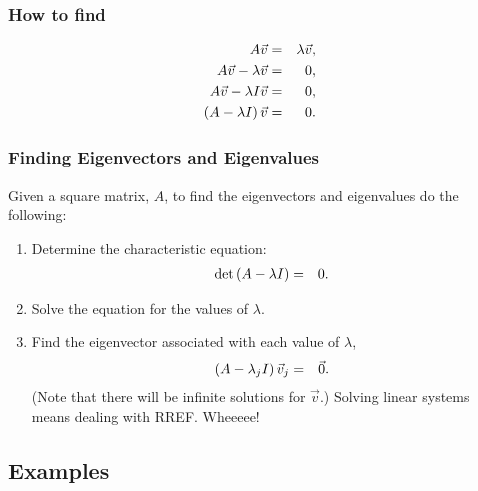 \begin{frame}
  \frametitle{How to find}

  \begin{eqnarray*}
    A \vec{v} & = & \lambda \vec{v}, \\
    A \vec{v} - \lambda \vec{v} & = & 0, \\
    A \vec{v} - \lambda I \vec{v} & = & 0, \\
    \left( A - \lambda I \right) \vec{v} & = & 0.
  \end{eqnarray*}


\end{frame}


\begin{frame}
  \frametitle{Finding Eigenvectors and Eigenvalues}

  Given a square matrix, $A$, to find the eigenvectors and eigenvalues do the following:
  \begin{enumerate}
  \item Determine the characteristic equation:
    \begin{eqnarray*}
      \det\left( A - \lambda I \right) & = & 0.
    \end{eqnarray*}
  \item Solve the equation for the values of $\lambda$.
  \item Find the eigenvector associated with each value of $\lambda$,
    \begin{eqnarray*}
      \left( A - \lambda_j I \right) \vec{v}_j & = & \vec{0}.
    \end{eqnarray*}
    (Note that there will be infinite solutions for $\vec{v}$.) Solving linear systems means dealing with RREF. Wheeeee!
  \end{enumerate}

\end{frame}

\subsection{Examples}

